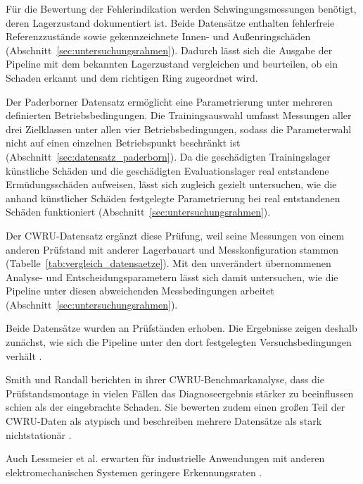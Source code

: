 
Für die Bewertung der Fehlerindikation werden Schwingungsmessungen benötigt,
deren Lagerzustand dokumentiert ist. Beide Datensätze enthalten fehlerfreie
Referenzzustände sowie gekennzeichnete Innen- und Außenringschäden
(Abschnitt~\ref{sec:untersuchungsrahmen}). Dadurch lässt sich die Ausgabe der
Pipeline mit dem bekannten Lagerzustand vergleichen und beurteilen, ob ein
Schaden erkannt und dem richtigen Ring zugeordnet wird.

Der Paderborner Datensatz ermöglicht eine Parametrierung unter mehreren
definierten Betriebsbedingungen. Die Trainingsauswahl umfasst Messungen aller
drei Zielklassen unter allen vier Betriebsbedingungen, sodass die Parameterwahl
nicht auf einen einzelnen Betriebspunkt beschränkt ist
(Abschnitt~\ref{sec:datensatz_paderborn}). Da die geschädigten Trainingslager künstliche
Schäden und die geschädigten Evaluationslager real entstandene Ermüdungsschäden
aufweisen, lässt sich zugleich gezielt untersuchen, wie die anhand künstlicher
Schäden festgelegte Parametrierung bei real entstandenen Schäden funktioniert
(Abschnitt~\ref{sec:untersuchungsrahmen}).

Der CWRU-Datensatz ergänzt diese Prüfung, weil seine Messungen von einem
anderen Prüfstand mit anderer Lagerbauart und Messkonfiguration stammen
(Tabelle~\ref{tab:vergleich_datensaetze}). Mit den unverändert übernommenen
Analyse- und Entscheidungsparametern lässt sich damit untersuchen, wie die
Pipeline unter diesen abweichenden Messbedingungen arbeitet
(Abschnitt~\ref{sec:untersuchungsrahmen}).


Beide Datensätze wurden an Prüfständen erhoben. Die Ergebnisse zeigen deshalb
zunächst, wie sich die Pipeline unter den dort festgelegten
Versuchsbedingungen verhält
\cite[S.~102--103, Abschn.~3.1--3.2]{smithRollingElementBearing2015}
\cite[S.~7--8, Abschn.~4--4.2]
{lessmeierConditionMonitoringBearing2016}.

Smith und Randall berichten in ihrer CWRU-Benchmarkanalyse, dass die
Prüfstandsmontage in vielen Fällen das Diagnoseergebnis stärker zu beeinflussen
schien als der eingebrachte Schaden. Sie bewerten zudem einen großen Teil der
CWRU-Daten als atypisch und beschreiben mehrere Datensätze als stark
nichtstationär
\cite[S.~124, Abschn.~7]{smithRollingElementBearing2015}.

Auch Lessmeier et al. erwarten für industrielle Anwendungen mit anderen
elektromechanischen Systemen geringere Erkennungsraten
\cite[S.~14, Abschn.~7.5]{lessmeierConditionMonitoringBearing2016}.

